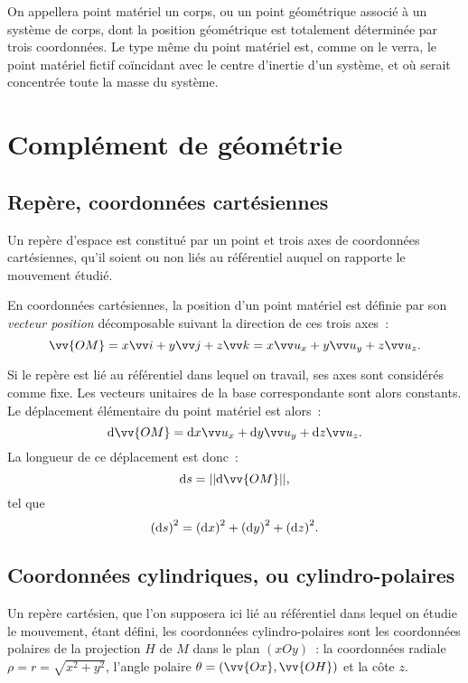On appellera point matériel un corps, ou un point géométrique associé à un 
système de corps, dont la position géométrique est totalement déterminée par 
trois coordonnées. Le type même du point matériel est, comme on le verra, le 
point matériel fictif coïncidant avec le centre d'inertie d'un système, et où 
serait concentrée toute la masse du système.

\section{Complément de géométrie}%
\label{chap1-sec:complementdegeometrie}%

\subsection{Repère, coordonnées cartésiennes}%
\label{chap1-subsec:reperecoord}%

Un repère d'espace est constitué par un point et trois axes de coordonnées 
cartésiennes, qu'il soient ou non liés au référentiel auquel on rapporte le 
mouvement étudié.

En coordonnées cartésiennes, la position d'un point matériel est définie par 
son \emph{vecteur position} décomposable suivant la direction de ces trois 
axes~:
\begin{equation}%
  \vv{OM}=x\vi+y\vj+z\vk=x\ux+y\uy+z\uz.%
\end{equation}%

Si le repère est lié au référentiel dans lequel on travail, ses axes sont 
considérés comme fixe. Les vecteurs unitaires de la base correspondante sont 
alors constants. Le déplacement élémentaire du point matériel est alors~:
\begin{equation}%
  \D\vv{OM}=\D x\ux+\D y\uy+\D z\uz.
\end{equation}%
La longueur de ce déplacement est donc~:
\begin{equation}%
  \D s = ||\D\vv{OM}||,
\end{equation}%
tel que
\begin{equation}%
  {(\D s)}^2={(\D x)}^2+{(\D y)}^2+ {(\D z)}^2.
\end{equation}%

\subsection{Coordonnées cylindriques, ou cylindro-polaires}%
\label{chap1-subsec:coordcylindriques}%

Un repère cartésien, que l'on supposera ici lié au référentiel dans lequel on 
étudie le mouvement, étant défini, les coordonnées cylindro-polaires sont les 
coordonnées polaires de la projection \(H\) de \(M\) dans le plan \((xOy)\)~: 
la coordonnées radiale \(\rho=r=\sqrt{x^2+y^2}\), l'angle polaire 
\(\theta=(\vv{Ox}, \vv{OH})\) et la côte \(z\).

